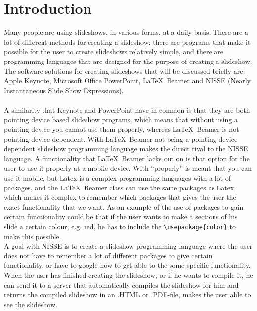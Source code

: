 \chapter{Introduction}
Many people are using slideshows, in various forms, at a daily basis. There are a lot of different methods for creating a slideshow; there are programs that make it possible for the user to create slideshows relatively simple, and there are programming languages that are designed for the purpose of creating a slideshow. The software solutions for creating slideshows that will be discussed briefly are; Apple Keynote, Microsoft Office PowerPoint, \LaTeX~Beamer and NISSE (Nearly Instantaneous Slide Show Expressions).
\\ \\
A similarity that Keynote and PowerPoint have in common is that they are both pointing device based slideshow programs, which means that without using a pointing device you cannot use them properly, whereas \LaTeX~Beamer is not pointing device dependent. With \LaTeX~Beamer not being a pointing device dependent slideshow programming language makes the direct rival to the NISSE language.
A functionality that \LaTeX~Beamer lacks out on is that option for the user to use it properly at a mobile device. With ``properly'' is meant that you can use it mobile, but Latex is a complex programming languages with a lot of packages, and the \LaTeX~Beamer class can use the same packages as Latex, which makes it complex to remember which packages that gives the user the exact functionality that we want. As an example of the use of packages to gain certain functionality could be that if the user wants to make a sections of his slide a certain colour, e.g. red, he has to include the \verb|\usepackage{color}| to make this possible. \\
A goal with NISSE is to create a slideshow programming language where the user does not have to remember a lot of different packages to give certain functionality, or have to google how to get able to the some specific functionality. When the user has finished creating the slideshow, or if he wants to compile it, he can send it to a server that automatically compiles the slideshow for him and returns the compiled slideshow in an .HTML or .PDF-file, makes the user able to see the slideshow.\\

